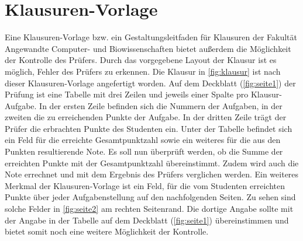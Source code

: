 \documentclass[notables, nomenclature, oneside, 150]{HSMW-Thesis}
\begin{document}
	\section{Klausuren-Vorlage}\label{sc:klausuren-vorlage}
	Eine Klausuren-Vorlage bzw. ein Gestaltungsleitfaden für Klausuren der Fakultät Angewandte Computer- und Biowissenschaften bietet außerdem die Möglichkeit der Kontrolle des Prüfers. Durch das vorgegebene Layout der Klausur ist es möglich, Fehler des Prüfers zu erkennen. Die Klausur in \autoref{fig:klausur} ist nach dieser Klausuren-Vorlage angefertigt worden. Auf dem Deckblatt (\ref{fig:seite1}) der Prüfung ist eine Tabelle mit drei Zeilen und jeweils einer Spalte pro Klausur-Aufgabe. In der ersten Zeile befinden sich die Nummern der Aufgaben, in der zweiten die zu erreichenden Punkte der Aufgabe. In der dritten Zeile trägt der Prüfer die erbrachten Punkte des Studenten ein. Unter der Tabelle befindet sich ein Feld für die erreichte Gesamtpunktzahl sowie ein weiteres für die aus den Punkten resultierende Note. Es soll nun überprüft werden, ob die Summe der erreichten Punkte mit der Gesamtpunktzahl übereinstimmt. Zudem wird auch die Note errechnet und mit dem Ergebnis des Prüfers verglichen werden. Ein weiteres Merkmal der Klausuren-Vorlage ist ein Feld, für die vom Studenten erreichten Punkte über jeder Aufgabenstellung auf den nachfolgenden Seiten. Zu sehen sind solche Felder in \autoref{fig:seite2} am rechten Seitenrand. Die dortige Angabe sollte mit der Angabe in der Tabelle auf dem Deckblatt (\ref{fig:seite1}) übereinstimmen und bietet somit noch eine weitere Möglichkeit der Kontrolle.
	
\end{document}
